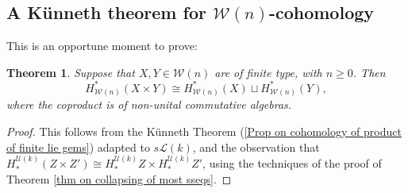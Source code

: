 \documentclass[11pt]{amsart} \renewcommand{\baselinestretch}{1.2}
\theoremstyle{plain}
\newtheorem{thm}{Theorem}[section]
\theoremstyle{definition}
\newcommand{\calU}{\mathcal{U}}
\newcommand{\calL}{\mathcal{L}}
\newcommand{\calw}{\mathcal{W}}
\newcommand{\calu}{\mathcal{U}}
\newcommand{\call}{\mathcal{L}}
\begin{document}
\begin{Calculations of HWn}
\subsection{A K\"unneth theorem for $\calw(n)$-cohomology}
This is an opportune moment to prove:
\begin{thm}
\label{Koszul-dual Hilton-Milnor theorem}
Suppose that $X,Y\in\calw(n)$ are  of finite type, with $n\geq0$. Then 
\[H^*_{\calw(n)}(X\times Y)\cong H^*_{\calw(n)}(X)\sqcup H^*_{\calw(n)}(Y),\]
where the coproduct is of non-unital commutative algebras.
\end{thm}
\begin{proof}
This follows from the K\"unneth Theorem (\ref{Prop on cohomology of product of finite lie gems}) adapted to $s\call(k)$, and the observation that $H_*^{\calu(k)}(Z\times Z')\cong H_*^{\calu(k)}Z\times H_*^{\calu(k)}Z'$,
using the techniques of the proof of Theorem \ref{thm on collapsing of most sseqs}.
\end{proof}


\end{Calculations of HWn}
\end{document}
